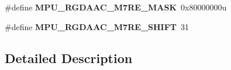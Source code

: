 \begin{DoxyCompactItemize}
\item 
\#define {\bfseries M\+P\+U\+\_\+\+R\+G\+D\+A\+A\+C\+\_\+\+M7\+R\+E\+\_\+\+M\+A\+SK}~0x80000000u\hypertarget{group__MPU__Register__Masks_ga91e2f6e31b038f7103f4824968045be5}{}\label{group__MPU__Register__Masks_ga91e2f6e31b038f7103f4824968045be5}

\item 
\#define {\bfseries M\+P\+U\+\_\+\+R\+G\+D\+A\+A\+C\+\_\+\+M7\+R\+E\+\_\+\+S\+H\+I\+FT}~31\hypertarget{group__MPU__Register__Masks_ga2ca22b48cd61a2b77f11fd0d41b0e475}{}\label{group__MPU__Register__Masks_ga2ca22b48cd61a2b77f11fd0d41b0e475}

\end{DoxyCompactItemize}


\subsection{Detailed Description}
